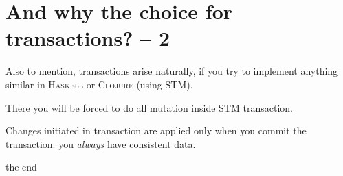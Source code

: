 \documentclass[10pt,fleqn]{article}
\theoremstyle{definition}
\theoremstyle{plain}
\begin{document}
\section*{And why the choice for transactions? -- 2}

Also to mention, transactions arise naturally, if you try to implement anything similar in
\textsc{Haskell} or \textsc{Clojure} (using \textsc{STM}).

There you will be forced to do all mutation inside STM transaction.

Changes initiated in transaction are applied only when you commit the transaction: you \emph{always} have consistent data.

\newpage
{\LARGE the end}
\newpage
\end{document}

